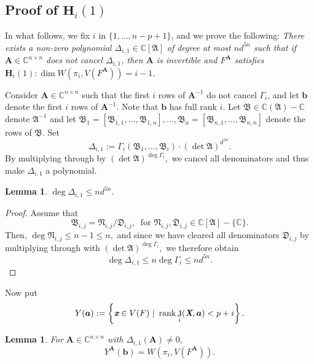 \documentclass[a4paper]{article}
\def\fB{{\mathfrak B}}
\def\fN{{\mathfrak N}}
\def\fD{{\mathfrak D}}
\def\A{\mathfrak{A}}
\def\Xb{\textit{\textbf{X}}}
\def\mA{{\bm A}}
\def\xb{\textit{\textbf{x}}}
\def\D{\Delta}
\DeclareMathOperator{\J}{J}
\DeclareMathOperator{\rk}{rank}
\def\C{\mathbb{C}}
\def\gi{\Gamma_i}
\newtheorem{lemma}[theorem]{Lemma}
\begin{document}
    
    
   
    \subsection{Proof of $\textbf{H}_i(1)$} 
     In what follows, we fix $i$ in $\{1,\dots,n-p+1\}$, and
    we prove the following: {\em There exists a non-zero polynomial
    $\D_{i,1} \in \C[\A]$ of degree at most $nd^{5n}$ such that if $\mA
    \in \C^{n\times n}$ does not cancel $\D_{i,1}$, then $\mA$ is
    invertible and $F^\mA$ satisfies $\textbf{H}_i(1): \dim W(\pi_i,V(F^{\mA}))=i-1$.}
    
    Consider $\bm A \in \C^{n \times n}$ such that the first $i$ rows of $\bm A^{-1}$ do not cancel $\gi$, and let $\bm b$ denote the first $i$ rows of $\bm A^{-1}$. Note that $\bm b$ has full rank $i$. Let $\fB \in \C(\A)-\C$ denote $\A^{-1}$ and let $\fB_1=[\fB_{1,1},\hdots,\fB_{1,n}],\hdots,\fB_n=[\fB_{n,1},\hdots,\fB_{n,n}]$ denote the rows of $\fB.$ Set  
    \[
    \Delta_{i,1} := \Gamma_i(\fB_1,\hdots,\fB_i)\cdot (\det \A)^{d^{5n}}. 
    \]
    By multiplying through by $(\det \A)^{\deg \gi},$ we cancel all denominators and thus make $\D_{i,1}$ a polynomial. 
    \begin{lemma}
    $\deg \Delta_{i,1} \leq nd^{5n}.$
    \end{lemma}
    \begin{proof}
        Assume that 
        \[
        \fB_{i,j}=\fN_{i,j}/\fD_{i,j},~ \textrm{ for } \fN_{i,j},\fD_{i,j} \in \C[\A]-\{\C\}.
        \]
        Then, $\deg \fN_{i,j} \leq n-1 \leq n,$ and since we have cleared all denominators $\fD_{i,j}$ by multiplying through with $(\det \A)^{\deg \gi},$ we therefore obtain 
        \[
        \deg \Delta_{i,1} \leq n\deg \gi \leq nd^{5n}.
        \]
    \end{proof}
    \noindent
    Now put 
    \[
    Y(\bm a) := \left\{\xb \in V(F)~|~\rk \J_i(\Xb,\bm a) < p+i\right\}.
    \]
    \begin{lemma}
    For $\mA \in \C^{n \times n}$ with $\Delta_{i,1}(\mA) \not = 0,$ 
    \[
    Y^{\mA}(\bm b) = W\left(\pi_i,V\left(F^{\mA}\right)\right).
    \]
    \end{lemma}
\end{document}
